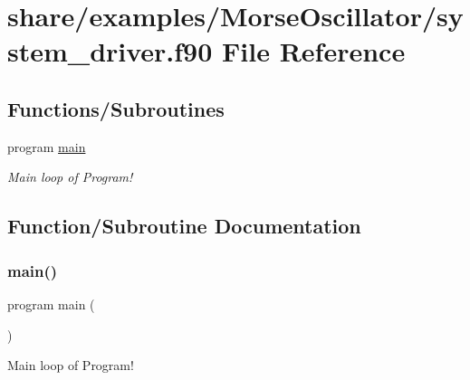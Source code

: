 \hypertarget{share_2examples_2_morse_oscillator_2system__driver_8f90}{}\section{share/examples/\+Morse\+Oscillator/system\+\_\+driver.f90 File Reference}
\label{share_2examples_2_morse_oscillator_2system__driver_8f90}
\subsection*{Functions/\+Subroutines}
\begin{DoxyCompactItemize}
\item 
program \hyperlink{share_2examples_2_morse_oscillator_2system__driver_8f90_a8ec2266d83cd6c0b762cbcbc92c0af3d}{main}
\begin{DoxyCompactList}\small\item\em Main loop of Program! \end{DoxyCompactList}\end{DoxyCompactItemize}


\subsection{Function/\+Subroutine Documentation}
\mbox{\label{share_2examples_2_morse_oscillator_2system__driver_8f90_a8ec2266d83cd6c0b762cbcbc92c0af3d}} 
\subsubsection{\texorpdfstring{main()}{main()}}
{\footnotesize\ttfamily program main (\begin{DoxyParamCaption}{ }\end{DoxyParamCaption})}



Main loop of Program! 

